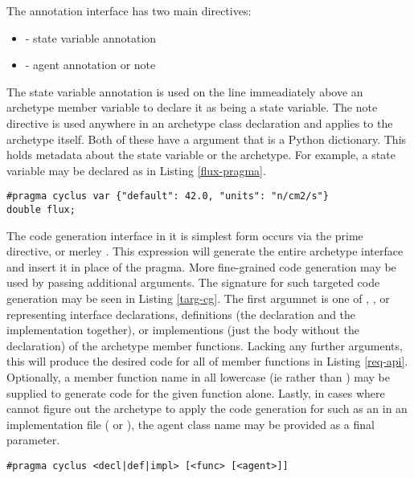 The \cycpp annotation interface has two main directives:
\begin{itemize}
    \item {} - state variable annotation
    \item {} - agent annotation or note
\end{itemize}
The state variable annotation is used on the line immeadiately above an archetype
member variable to declare it as being a state variable. The note directive is used
anywhere in an archetype class declaration and applies to the archetype itself.
Both of these have a  argument that is a Python dictionary. This 
holds metadata about the state variable or the archetype. For example, a 
state variable may be declared as in Listing \ref{flux-pragma}.

\begin{lstlisting}[caption={Flux State Variable Annotation}, label=flux-pragma]
#pragma cyclus var {"default": 42.0, "units": "n/cm2/s"}
double flux;
\end{lstlisting}

The code generation interface in it is simplest form occurs via the \cyclus 
prime directive, or merley .  This expression will 
generate the entire archetype interface and insert it in place of the pragma.
More fine-grained code generation may be used by passing additional arguments.
The signature for such targeted code generation may be seen in Listing \ref{targ-cg}.
The first argumnet is one of , , or  representing 
interface declarations, definitions (the declaration and the implementation together), 
or implementions (just the body without the declaration) of the archetype member
functions. Lacking any further arguments, this will produce the desired code for 
all of member functions in Listing \ref{req-api}.  Optionally, a member function 
name in all lowercase (ie  rather than ) may 
be supplied to generate code for the given function alone.  Lastly, in 
cases where \cycpp cannot figure out the archetype to apply the code generation for
such as an in an implementation file ( or ), the agent
class name may be provided as a final parameter.

\begin{lstlisting}[caption={Targeted Code Generation Directive Signatures}, 
                   label=targ-cg]
#pragma cyclus <decl|def|impl> [<func> [<agent>]]
\end{lstlisting}

